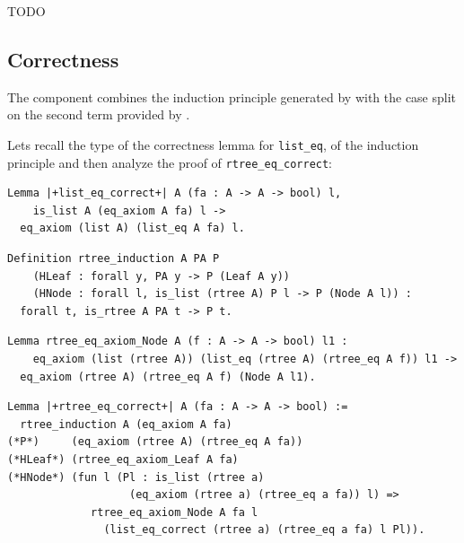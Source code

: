 \documentclass[sigplan,10pt,review]{acmart}\settopmatter{printfolios=true,printccs=false,printacmref=false}
\newcommand{\derive}[1]{\keys{#1}}
\begin{document}
TODO

\subsection{Correctness} %
\label{sec:derive:eqcorrect}

The \derive{eqcorrect} component combines the induction
principle generated by \derive{induction} with the
case split on the second term provided by \derive{eqK}.

Lets recall the type of the correctness lemma for
\lstinline+list_eq+, of the induction principle
and then analyze the proof of
\lstinline+rtree_eq_correct+:

\begin{minipage}{\textwidth}\begin{lstlisting}
Lemma |+list_eq_correct+| A (fa : A -> A -> bool) l,
    is_list A (eq_axiom A fa) l ->
  eq_axiom (list A) (list_eq A fa) l.
\end{lstlisting}\end{minipage}

\begin{minipage}{\textwidth}\begin{lstlisting}
Definition rtree_induction A PA P  
    (HLeaf : forall y, PA y -> P (Leaf A y))
    (HNode : forall l, is_list (rtree A) P l -> P (Node A l)) :
  forall t, is_rtree A PA t -> P t.
\end{lstlisting}\end{minipage}

\begin{minipage}{\textwidth}\begin{lstlisting}
Lemma rtree_eq_axiom_Node A (f : A -> A -> bool) l1 :
    eq_axiom (list (rtree A)) (list_eq (rtree A) (rtree_eq A f)) l1 ->
  eq_axiom (rtree A) (rtree_eq A f) (Node A l1).
\end{lstlisting}\end{minipage}
       
\begin{minipage}{\textwidth}\begin{lstlisting}
Lemma |+rtree_eq_correct+| A (fa : A -> A -> bool) :=
  rtree_induction A (eq_axiom A fa)
(*P*)     (eq_axiom (rtree A) (rtree_eq A fa))
(*HLeaf*) (rtree_eq_axiom_Leaf A fa)
(*HNode*) (fun l (Pl : is_list (rtree a)
                   (eq_axiom (rtree a) (rtree_eq a fa)) l) =>
             rtree_eq_axiom_Node A fa l
               (list_eq_correct (rtree a) (rtree_eq a fa) l Pl)).
\end{lstlisting}\end{minipage}
\end{document}
